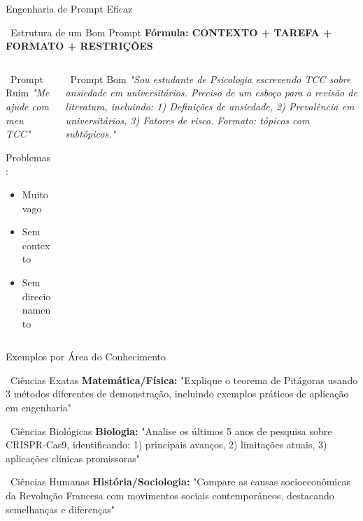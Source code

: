 \documentclass[aspectratio=169,12pt]{beamer}
\begin{document}
\begin{frame}{Engenharia de Prompt Eficaz}
    \begin{block}{\faCode\, Estrutura de um Bom Prompt}
        \textbf{Fórmula: CONTEXTO + TAREFA + FORMATO + RESTRIÇÕES}
    \end{block}
    
    \begin{columns}
        \begin{column}{0.5\textwidth}
            \begin{alertblock}{\faThumbsDown\, Prompt Ruim}
                \textit{"Me ajude com meu TCC"}
                
                \textcolor{danger}{Problemas:}
                \begin{itemize}
                    \item Muito vago
                    \item Sem contexto
                    \item Sem direcionamento
                \end{itemize}
            \end{alertblock}
        \end{column}
        \begin{column}{0.5\textwidth}
            \begin{exampleblock}{\faThumbsUp\, Prompt Bom}
                \textit{"Sou estudante de Psicologia escrevendo TCC sobre ansiedade em universitários. Preciso de um esboço para a revisão de literatura, incluindo: 1) Definições de ansiedade, 2) Prevalência em universitários, 3) Fatores de risco. Formato: tópicos com subtópicos."}
            \end{exampleblock}
        \end{column}
    \end{columns}
\end{frame}

\begin{frame}{Exemplos por Área do Conhecimento}
    \begin{block}{\faFlask\, Ciências Exatas}
        \textbf{Matemática/Física:} "Explique o teorema de Pitágoras usando 3 métodos diferentes de demonstração, incluindo exemplos práticos de aplicação em engenharia"
    \end{block}
    
    \begin{block}{\faLeaf\, Ciências Biológicas}
        \textbf{Biologia:} "Analise os últimos 5 anos de pesquisa sobre CRISPR-Cas9, identificando: 1) principais avanços, 2) limitações atuais, 3) aplicações clínicas promissoras"
    \end{block}
    
    \begin{block}{\faUsers\, Ciências Humanas}
        \textbf{História/Sociologia:} "Compare as causas socioeconômicas da Revolução Francesa com movimentos sociais contemporâneos, destacando semelhanças e diferenças"
    \end{block}
\end{frame}
\end{document}
